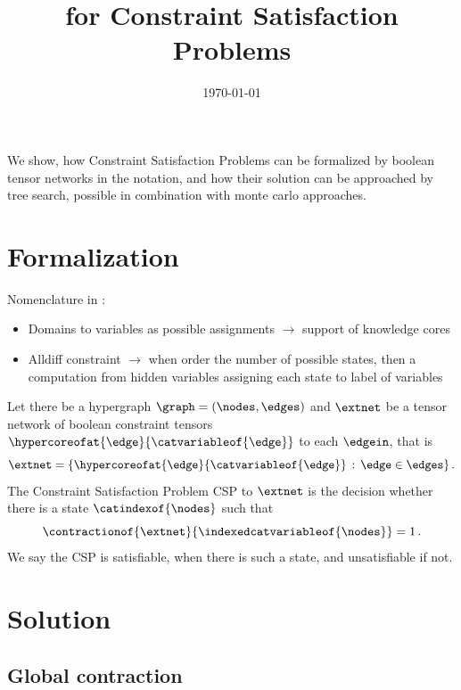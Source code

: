 \documentclass[aps,onecolumn,nofootinbib,pra]{article}
\begin{document}
    \title{\tnreason{} for Constraint Satisfaction Problems}

    \maketitle
    \date{\today}


    We show, how Constraint Satisfaction Problems can be formalized by boolean tensor networks in the \tnreason{} notation, and how their solution can be approached by tree search, possible in combination with monte carlo approaches.


    \section{Formalization}

    Nomenclature in \cite{russell_artificial_2021}:
    \begin{itemize}
        \item Domains to variables as possible assignments $\rightarrow$ support of knowledge cores
        \item Alldiff constraint $\rightarrow$ when order the number of possible states, then a computation from hidden variables assigning each state to label of variables
    \end{itemize}


    \begin{definition}
        Let there be a hypergraph $\graph=(\nodes,\edges)$ and $\extnet$ be a tensor network of boolean constraint tensors $ \hypercoreofat{\edge}{\catvariableof{\edge}}$ to each $\edgein$, that is
        \[ \extnet = \{ \hypercoreofat{\edge}{\catvariableof{\edge}} \, : \, \edge\in\edges \} \, .\]
        The Constraint Satisfaction Problem CSP to $\extnet$ is the decision whether there is a state $\catindexof{\nodes}$ such that
        \[ \contractionof{\extnet}{\indexedcatvariableof{\nodes}} = 1 \, . \]
        We say the CSP is satisfiable, when there is such a state, and unsatisfiable if not.
    \end{definition}


    \section{Solution}

    \subsection{Global contraction}
\end{document}
